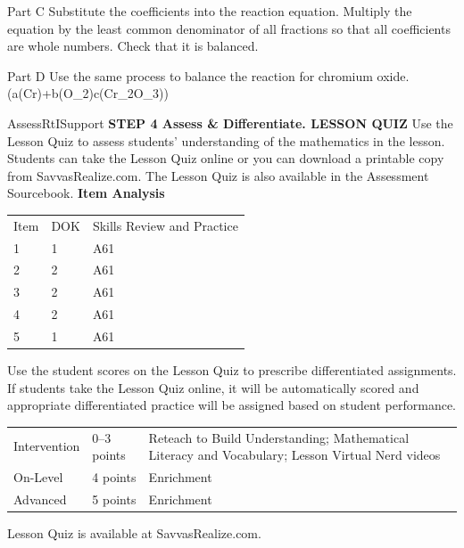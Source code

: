 \documentclass{article}
\newenvironment{practice}[2]{}{}        %
\newenvironment{te-addendum}[2]{}{}     %
\newcommand{\answer}[1]{}               %
\newcommand{\placeholder}[2]{}          %
\begin{document}
\begin{practice}{28}{3}
Part C Substitute the coefficients into the reaction equation. Multiply the equation by the least common denominator of all fractions so that all coefficients are whole numbers. Check that it is balanced.
\answer{Part C (N_2+3H_2\to2NH_3), balanced 2N and 6H on each side.}
Part D Use the same process to balance the reaction for chromium oxide.
(a(Cr)+b(O_2)\to c(Cr_2O_3))
\placeholder{diagram}{Chromium purple sphere plus oxygen red two-sphere molecule, arrow to Cr2O3 diagram with two purple and three red spheres connected by bonds. Labels Chromium, Oxygen, Cr2O3; equation a(Cr)+b(O2) to c(Cr2O3).}
\answer{Part D (4Cr+3O_2\longrightarrow2Cr_2O_3)}
\end{practice}
\begin{te-addendum}{Assess}{RtISupport}
\textbf{STEP 4 Assess \& Differentiate. LESSON QUIZ}
Use the Lesson Quiz to assess students' understanding of the mathematics in the lesson.
Students can take the Lesson Quiz online or you can download a printable copy from SavvasRealize.com. The Lesson Quiz is also available in the Assessment Sourcebook.
\textbf{Item Analysis}
\begin{tabular}{lll}
Item & DOK & Skills Review and Practice \\
1 & 1 & A61 \\
2 & 2 & A61 \\
3 & 2 & A61 \\
4 & 2 & A61 \\
5 & 1 & A61 \\
\end{tabular}
Use the student scores on the Lesson Quiz to prescribe differentiated assignments.
If students take the Lesson Quiz online, it will be automatically scored and appropriate differentiated practice will be assigned based on student performance.
\begin{tabular}{lll}
Intervention & 0--3 points & Reteach to Build Understanding; Mathematical Literacy and Vocabulary; Lesson Virtual Nerd videos \\
On-Level & 4 points & Enrichment \\
Advanced & 5 points & Enrichment \\
\end{tabular}
Lesson Quiz is available at SavvasRealize.com.
\end{te-addendum}
\end{document}
